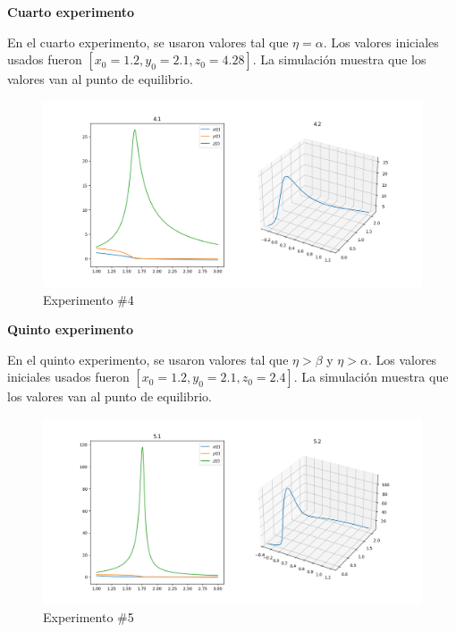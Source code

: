 \documentclass{wscpaperproc}
\theoremstyle{wsc}
\begin{document}
\vspace*{7cm}
{\bf Cuarto experimento}

En el cuarto experimento, se usaron valores tal que $\eta = \alpha$.
Los valores iniciales usados fueron $[x_0=1.2, y_0=2.1, z_0=4.28]$. La simulación muestra
que los valores van al punto de equilibrio.

\begin{figure}[h!]
	\includegraphics[width=\linewidth]{./images/4.png}
	\caption{Experimento \#4}
\end{figure}

\vspace*{7cm}
{\bf Quinto experimento}

En el quinto experimento, se usaron valores tal que $\eta > \beta$ y $\eta > \alpha$.
Los valores iniciales usados fueron $[x_0=1.2, y_0=2.1, z_0=2.4]$. La simulación muestra
que los valores van al punto de equilibrio.

\begin{figure}[h!]
	\includegraphics[width=\linewidth]{./images/5.png}
	\caption{Experimento \#5}
\end{figure}

\vspace*{4cm}
\end{document}
